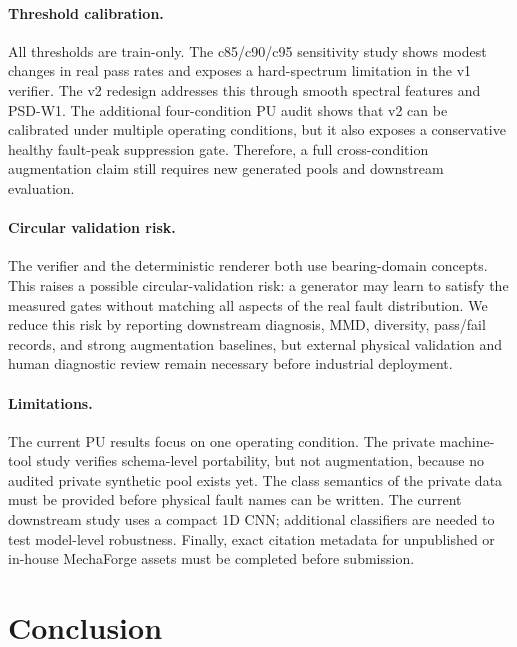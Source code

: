 \documentclass[review,3p,times]{elsarticle}
\begin{document}
\paragraph{Threshold calibration.}
All thresholds are train-only. The c85/c90/c95 sensitivity study shows modest
changes in real pass rates and exposes a hard-spectrum limitation in the v1
verifier. The v2 redesign addresses this through smooth spectral features and
PSD-W1. The additional four-condition PU audit shows that v2 can be calibrated
under multiple operating conditions, but it also exposes a conservative healthy
fault-peak suppression gate. Therefore, a full cross-condition augmentation
claim still requires new generated pools and downstream evaluation.

\paragraph{Circular validation risk.}
The verifier and the deterministic renderer both use bearing-domain concepts.
This raises a possible circular-validation risk: a generator may learn to
satisfy the measured gates without matching all aspects of the real fault
distribution. We reduce this risk by reporting downstream diagnosis, MMD,
diversity, pass/fail records, and strong augmentation baselines, but external
physical validation and human diagnostic review remain necessary before
industrial deployment.

\paragraph{Limitations.}
The current PU results focus on one operating condition. The private
machine-tool study verifies schema-level portability, but not augmentation,
because no audited private synthetic pool exists yet. The class semantics of
the private data must be provided before physical fault names can be written.
The current downstream study uses a compact 1D CNN; additional classifiers are
needed to test model-level robustness. Finally, exact citation metadata for
unpublished or in-house MechaForge assets must be completed before submission.

\section{Conclusion}
\label{sec:conclusion}
\end{document}

